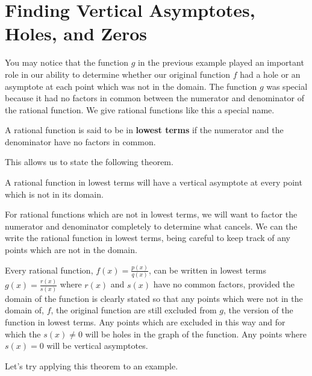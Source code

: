 \documentclass{ximera}
\begin{document}
\section{Finding Vertical Asymptotes, Holes, and Zeros}

You may notice that the function $g$ in the previous example played an important role in our ability to determine whether our original function $f$ had a hole or an asymptote at each point which was not in the domain.  The function $g$ was special because it had no factors in common between the numerator and denominator of the rational function.  We give rational functions like this a special name. 

\begin{definition}  
A rational function is said to be in \textbf{lowest terms} if the numerator and the denominator have no factors in common.
\end{definition}

This allows us to state the following theorem.

\begin{theorem}
A rational function in lowest terms will have a vertical asymptote at every point which is not in its domain.
\end{theorem}

For rational functions which are not in lowest terms, we will want to factor the numerator and denominator completely to determine what cancels.  We can the write the rational function in lowest terms, being careful to keep track of any points which are not in the domain.  

\begin{theorem}
Every rational function, $f(x)=\frac{p(x)}{q(x)}$, can be written in lowest terms $g(x)=\frac{r(x)}{s(x)}$ where $r(x)$ and $s(x)$ have no common factors, provided the domain of the function is clearly stated so that any points which were not in the domain of, $f$, the original function are still excluded from $g$, the version of the function in lowest terms.  Any points which are excluded in this way and for which the  $s(x) \neq 0$ will be holes in the graph of the function.  Any points where $s(x)=0$ will be vertical asymptotes.
\end{theorem}

Let's try applying this theorem to an example.
\end{document}

